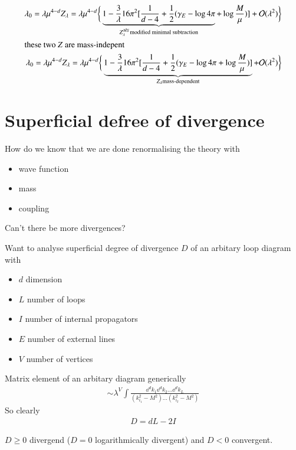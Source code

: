 \begin{itemize}
\begin{align*}
			\lambda_0 =  \lambda \mu^{4-d}Z_\lambda = \lambda \mu^{4-d} \bigg\{ \underbrace{1- \frac{3}{\lambda}{16\pi^2} [ \frac{1}{d-4} +\frac{1}{2} (\gamma_E -\log{4\pi} }_{Z^{\bar{MS}}_\lambda \text{modified minimal subtraction}} + \log{\frac{M}{\mu}})] + \mathcal{O}(\lambda^2) \bigg\} \\
			\shortintertext{\text{these two $Z$ are mass-indepent}}
			\lambda_0 =  \lambda \mu^{4-d}Z_\lambda = \lambda \mu^{4-d} \bigg\{ \underbrace{1- \frac{3}{\lambda}{16\pi^2} [ \frac{1}{d-4} +\frac{1}{2} (\gamma_E -\log{4\pi}  + \log{\frac{M}{\mu}})] }_{Z_\lambda \text{mass-dependent}}+ \mathcal{O}(\lambda^2) \bigg\} 
		\end{align*}
\end{itemize}

\section{Superficial defree of divergence}
How do we know that we are done renormalising the theory with
\begin{itemize}
	\item wave function
	\item mass
	\item coupling
\end{itemize}
Can't there be more divergences?

Want to analyse superficial degree of divergence $D$ of an arbitary loop diagram with 
\begin{itemize}
	\item $d$ dimension
	\item $L$ number of loops
	\item $I$ number of internal propagators
	\item $E$ number of external lines
	\item $V$ number of vertices
\end{itemize}

Matrix element of an arbitary diagram generically 
\begin{align*}
	\sim \lambda^V \int \frac{\dd^d k_1 \dd^d k_2 \dots \dd^d k_L}{(k_{i_1}^2 - M^2) \dots (k_{i_I}^2 - M^2)}
\end{align*}
So clearly 
\begin{align}
	D = d L - 2 I
\end{align}

$D \geq 0 $ divergend ($D=0$ logarithmically divergent) and $D < 0$ convergent.

